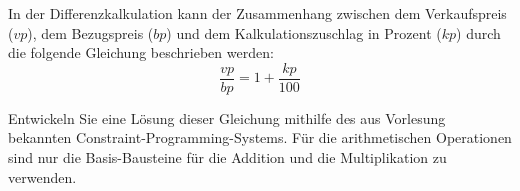 In der Differenzkalkulation kann der Zusammenhang zwischen dem
Verkaufspreis ($vp$), dem Bezugspreis ($bp$) und dem
Kalkulationszuschlag in Prozent ($kp$) durch die folgende Gleichung
beschrieben werden: 
$$ \frac{vp}{bp} = 1 + \frac{kp}{100}$$ 

Entwickeln Sie eine Lösung dieser Gleichung mithilfe des aus Vorlesung
bekannten Con\-straint-Programming-Systems. Für die arithmetischen
Operationen sind nur die Basis-Bausteine für die Addition und die
Multiplikation zu verwenden.

